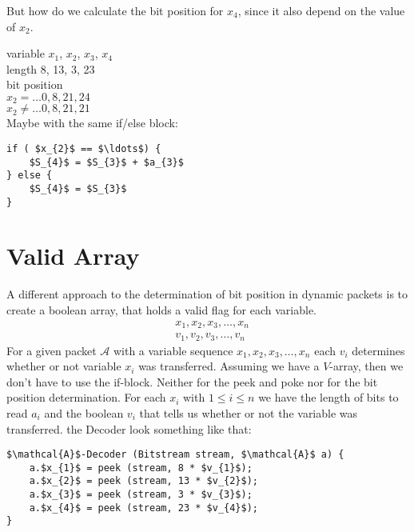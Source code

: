 \documentclass[parskip=half,paper=a4,DIV=13]{scrartcl}
\begin{document}
But how do we calculate the bit position for $x_{4}$, since it also depend on the value of $x_{2}$.

variable   $x_{1}$, $x_{2}$, $x_{3}$, $x_{4}$\\
length        8, 13, 3, 23\\
bit position\\
$x_{2} = \ldots  0, 8, 21, 24$\\
$x_{2} \neq \ldots  0, 8, 21, 21$\\

Maybe with the same if/else block:

\begin{lstlisting}[mathescape]
if ( $x_{2}$ == $\ldots$) {
	$S_{4}$ = $S_{3}$ + $a_{3}$
} else {
	$S_{4}$ = $S_{3}$
}
\end{lstlisting}

\section{Valid Array}

A different approach to the determination of bit position in dynamic packets is to create a boolean array, that holds a valid flag for each variable.
\begin{align*}
	&x_{1}, x_{2}, x_{3}, \ldots , x_{n}\\
	&v_{1}, v_{2}, v_{3}, \ldots , v_{n}	
\end{align*}
For a given packet $\mathcal{A}$ with a variable sequence $x_{1}, x_{2}, x_{3}, \ldots , x_{n}$ each $v_{i}$ determines whether or not variable $x_{i}$ was transferred.
Assuming we have a $V$-array, then we don't have to use the if-block.
Neither for the peek and poke nor for the bit position determination.
For each $x_{i}$ with $1\leq i\leq n$ we have the length of bits to read $a_{i}$ and the boolean $v_{i}$ that tells us whether or not the variable was transferred.
the Decoder look something like that:
\begin{lstlisting}[mathescape]
$\mathcal{A}$-Decoder (Bitstream stream, $\mathcal{A}$ a) {
	a.$x_{1}$ = peek (stream, 8 * $v_{1}$);
	a.$x_{2}$ = peek (stream, 13 * $v_{2}$);
	a.$x_{3}$ = peek (stream, 3 * $v_{3}$);
	a.$x_{4}$ = peek (stream, 23 * $v_{4}$);
}
\end{lstlisting}
\end{document}
